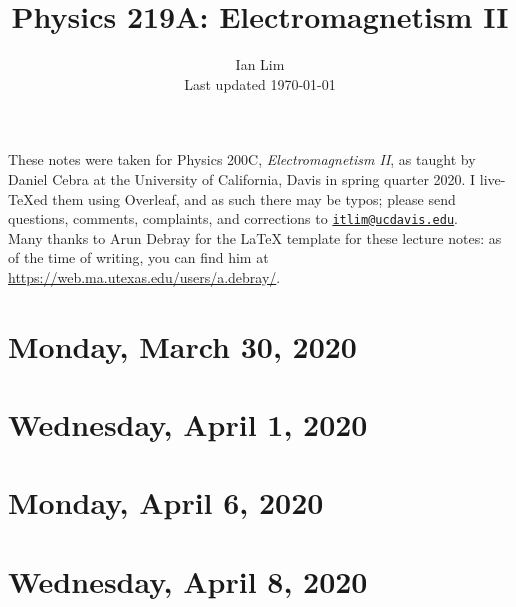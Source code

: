 \documentclass{../mynotes}
\begin{document}
\title{Physics 219A: Electromagnetism II}
\author{Ian Lim\\ Last updated \today}
\maketitle
{\small\noindent These notes were taken for Physics 200C, \emph{Electromagnetism II}, as taught by Daniel Cebra at the University of California, Davis in spring quarter 2020. I live-\TeX ed them using Overleaf, and as such there may be typos; please send questions, comments, complaints, and corrections to 
\href{mailto:itlim@ucdavis.edu?subject=200C\%20Lecture\%20Notes}{\texttt{itlim@ucdavis.edu}}.\\
Many thanks to Arun Debray for the {\LaTeX} template for these lecture notes: as of the time of writing, you can find him at \url{https://web.ma.utexas.edu/users/a.debray/}.}

\tableofcontents

\section{Monday, March 30, 2020}
	
\section{Wednesday, April 1, 2020}
    
    
\section{Monday, April 6, 2020}
    
\section{Wednesday, April 8, 2020}
    
\end{document}
